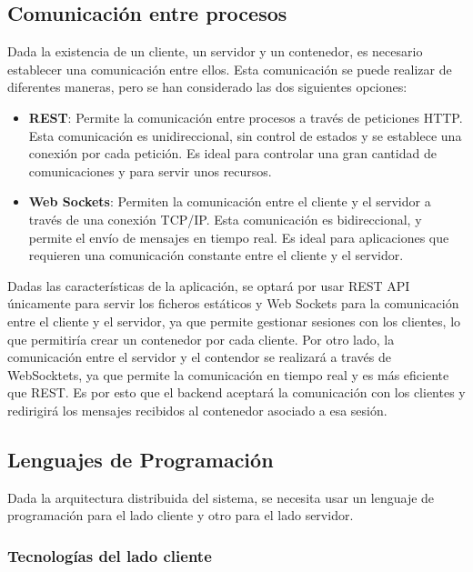 \subsection{Comunicación entre procesos} \label{sec:comunicacion-procesos}

Dada la existencia de un cliente, un servidor y un contenedor, es necesario establecer una comunicación entre ellos. Esta comunicación se puede realizar de diferentes maneras, pero se han considerado las dos siguientes opciones: 

\begin{itemize}
    \item \textbf{REST}: Permite la comunicación entre procesos a través de peticiones HTTP. Esta comunicación es unidireccional, sin control de estados y se establece una conexión por cada petición. Es ideal para controlar una gran cantidad de comunicaciones y para servir unos recursos.
    \item \textbf{Web Sockets}: Permiten la comunicación entre el cliente y el servidor a través de una conexión TCP/IP. Esta comunicación es bidireccional, y permite el envío de mensajes en tiempo real. Es ideal para aplicaciones que requieren una comunicación constante entre el cliente y el servidor.
\end{itemize}

Dadas las características de la aplicación, se optará por usar REST API únicamente para servir los ficheros estáticos y Web Sockets para la comunicación entre el cliente y el servidor, ya que permite gestionar sesiones con los clientes, lo que permitiría crear un contenedor por cada cliente. Por otro lado, la comunicación entre el servidor y el contendor se realizará a través de WebSocktets, ya que permite la comunicación en tiempo real y es más eficiente que REST. 
Es por esto que el backend aceptará la comunicación con los clientes y redirigirá los mensajes recibidos al contenedor asociado a esa sesión. 

\subsection{Lenguajes de Programación} \label{sec:programacion}

Dada la arquitectura distribuida del sistema, se necesita usar un lenguaje de programación para el lado cliente y otro para el lado servidor.

\subsubsection{Tecnologías del lado cliente} \label{sec:tecnologias-cliente}

